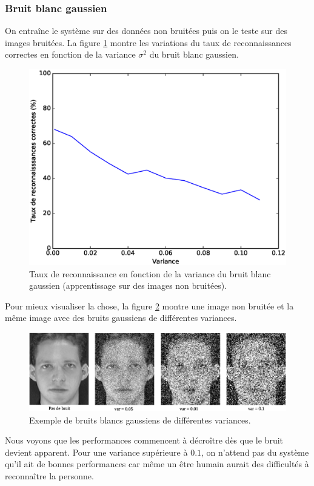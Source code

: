 \subsubsection{Bruit blanc gaussien}
On entraîne le système sur des données non bruitées puis on le teste sur des images
bruitées. La figure \ref{fig:robustness:gaussien:test} montre les variations du taux
de reconnaissances correctes en fonction de la variance $\sigma^2$ du bruit blanc
gaussien.
\begin{figure}[H]
    \centering
    \includegraphics[scale=0.5]{images/robustesse_gaussien_test}
    \caption{Taux de reconnaissance en fonction de la variance du bruit blanc gaussien
    (apprentissage sur des images non bruitées).}
    \label{fig:robustness:gaussien:test}
\end{figure}
Pour mieux visualiser la chose, la figure \ref{fig:robustness:gaussien:exemple} montre
une image non bruitée et la même image avec des bruits gaussiens de différentes variances.
\begin{figure}[H]
    \centering
    \includegraphics[scale=0.45]{images/robustness_gaussien_exemple}
    \caption{Exemple de bruits blancs gaussiens de différentes variances.}
    \label{fig:robustness:gaussien:exemple}
\end{figure}
Nous voyons que les performances commencent à décroître dès que le bruit
devient apparent. Pour une variance supérieure à $0.1$, on n'attend pas du système
qu'il ait de bonnes performances car même un être humain aurait des difficultés à
reconnaître la personne.


